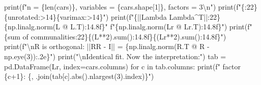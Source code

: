 \documentclass[
  letterpaper,
  10pt,
  twoside,
  openright,
  numbers=noenddot,
  chapterprefix=true]{scrbook}
\newenvironment{Shaded}{}{}
\newcommand{\BuiltInTok}[1]{\textcolor[rgb]{0.84,0.23,0.29}{#1}}
\newcommand{\CharTok}[1]{\textcolor[rgb]{0.01,0.18,0.38}{#1}}
\newcommand{\ControlFlowTok}[1]{\textcolor[rgb]{0.84,0.23,0.29}{#1}}
\newcommand{\DecValTok}[1]{\textcolor[rgb]{0.00,0.36,0.77}{#1}}
\newcommand{\KeywordTok}[1]{\textcolor[rgb]{0.84,0.23,0.29}{#1}}
\newcommand{\NormalTok}[1]{\textcolor[rgb]{0.14,0.16,0.18}{#1}}
\newcommand{\OperatorTok}[1]{\textcolor[rgb]{0.14,0.16,0.18}{#1}}
\newcommand{\SpecialCharTok}[1]{\textcolor[rgb]{0.00,0.36,0.77}{#1}}
\newcommand{\SpecialStringTok}[1]{\textcolor[rgb]{0.01,0.18,0.38}{#1}}
\newcommand{\StringTok}[1]{\textcolor[rgb]{0.01,0.18,0.38}{#1}}
\begin{document}
\begin{Shaded}
\begin{Highlighting}[]
\BuiltInTok{print}\NormalTok{(}\SpecialStringTok{f"n = }\SpecialCharTok{\{}\BuiltInTok{len}\NormalTok{(cars)}\SpecialCharTok{\}}\SpecialStringTok{, variables = }\SpecialCharTok{\{}\NormalTok{cars}\SpecialCharTok{.}\NormalTok{shape[}\DecValTok{1}\NormalTok{]}\SpecialCharTok{\}}\SpecialStringTok{, factors = 3}\CharTok{\textbackslash{}n}\SpecialStringTok{"}\NormalTok{)}
\BuiltInTok{print}\NormalTok{(}\SpecialStringTok{f"}\SpecialCharTok{\{}\StringTok{\textquotesingle{}\textquotesingle{}}\SpecialCharTok{:22\}\{}\StringTok{\textquotesingle{}unrotated\textquotesingle{}}\SpecialCharTok{:\textgreater{}14\}\{}\StringTok{\textquotesingle{}varimax\textquotesingle{}}\SpecialCharTok{:\textgreater{}14\}}\SpecialStringTok{"}\NormalTok{)}
\BuiltInTok{print}\NormalTok{(}\SpecialStringTok{f"}\SpecialCharTok{\{}\StringTok{\textquotesingle{}||Lambda Lambda\^{}T||\textquotesingle{}}\SpecialCharTok{:22\}\{}\NormalTok{np}\SpecialCharTok{.}\NormalTok{linalg}\SpecialCharTok{.}\NormalTok{norm(L }\OperatorTok{@}\NormalTok{ L.T)}\SpecialCharTok{:14.8f\}}\SpecialStringTok{"}
      \SpecialStringTok{f"}\SpecialCharTok{\{}\NormalTok{np}\SpecialCharTok{.}\NormalTok{linalg}\SpecialCharTok{.}\NormalTok{norm(Lr }\OperatorTok{@}\NormalTok{ Lr.T)}\SpecialCharTok{:14.8f\}}\SpecialStringTok{"}\NormalTok{)}
\BuiltInTok{print}\NormalTok{(}\SpecialStringTok{f"}\SpecialCharTok{\{}\StringTok{\textquotesingle{}sum of communalities\textquotesingle{}}\SpecialCharTok{:22\}\{}\NormalTok{(L}\OperatorTok{**}\DecValTok{2}\NormalTok{)}\SpecialCharTok{.}\BuiltInTok{sum}\NormalTok{()}\SpecialCharTok{:14.8f\}\{}\NormalTok{(Lr}\OperatorTok{**}\DecValTok{2}\NormalTok{)}\SpecialCharTok{.}\BuiltInTok{sum}\NormalTok{()}\SpecialCharTok{:14.8f\}}\SpecialStringTok{"}\NormalTok{)}
\BuiltInTok{print}\NormalTok{(}\SpecialStringTok{f"}\CharTok{\textbackslash{}n}\SpecialStringTok{R is orthogonal: ||R\textquotesingle{}R {-} I|| = }\SpecialCharTok{\{}\NormalTok{np}\SpecialCharTok{.}\NormalTok{linalg}\SpecialCharTok{.}\NormalTok{norm(R.T }\OperatorTok{@}\NormalTok{ R }\OperatorTok{{-}}\NormalTok{ np.eye(}\DecValTok{3}\NormalTok{))}\SpecialCharTok{:.2e\}}\SpecialStringTok{"}\NormalTok{)}
\BuiltInTok{print}\NormalTok{(}\StringTok{"}\CharTok{\textbackslash{}n}\StringTok{Identical fit. Now the interpretation:"}\NormalTok{)}
\NormalTok{tab }\OperatorTok{=}\NormalTok{ pd.DataFrame(Lr, index}\OperatorTok{=}\NormalTok{cars.columns)}
\ControlFlowTok{for}\NormalTok{ c }\KeywordTok{in}\NormalTok{ tab.columns:}
    \BuiltInTok{print}\NormalTok{(}\SpecialStringTok{f"  factor }\SpecialCharTok{\{}\NormalTok{c}\OperatorTok{+}\DecValTok{1}\SpecialCharTok{\}}\SpecialStringTok{: }\SpecialCharTok{\{}\StringTok{\textquotesingle{}, \textquotesingle{}}\SpecialCharTok{.}\NormalTok{join(tab[c].}\BuiltInTok{abs}\NormalTok{().nlargest(}\DecValTok{3}\NormalTok{).index)}\SpecialCharTok{\}}\SpecialStringTok{"}\NormalTok{)}
\end{Highlighting}
\end{Shaded}
\end{document}
